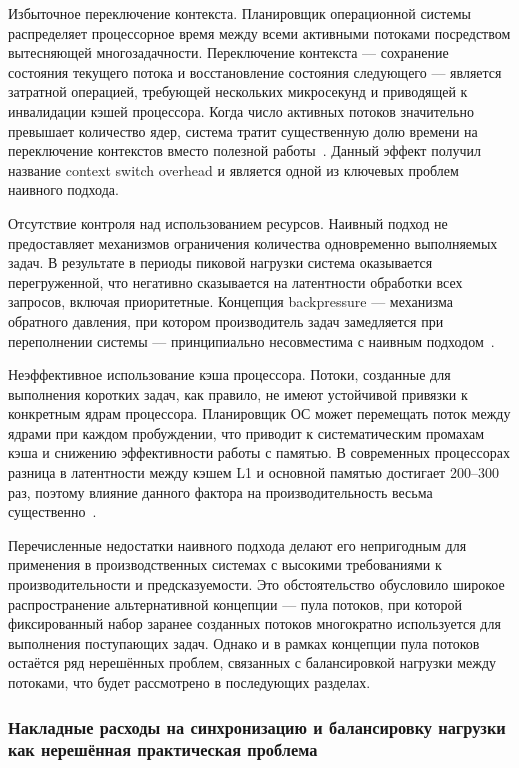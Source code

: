 Избыточное переключение контекста. Планировщик операционной системы распределяет процессорное время между всеми активными потоками посредством вытесняющей многозадачности. Переключение контекста --- сохранение состояния текущего потока и восстановление состояния следующего --- является затратной операцией, требующей нескольких микросекунд и приводящей к инвалидации кэшей процессора. Когда число активных потоков значительно превышает количество ядер, система тратит существенную долю времени на переключение контекстов вместо полезной работы~\cite{Tanenbaum2014}. Данный эффект получил название context switch overhead и является одной из ключевых проблем наивного подхода.

Отсутствие контроля над использованием ресурсов. Наивный подход не предоставляет механизмов ограничения количества одновременно выполняемых задач. В результате в периоды пиковой нагрузки система оказывается перегруженной, что негативно сказывается на латентности обработки всех запросов, включая приоритетные. Концепция backpressure --- механизма обратного давления, при котором производитель задач замедляется при переполнении системы --- принципиально несовместима с наивным подходом~\cite{Reactive2014}.

Неэффективное использование кэша процессора. Потоки, созданные для выполнения коротких задач, как правило, не имеют устойчивой привязки к конкретным ядрам процессора. Планировщик ОС может перемещать поток между ядрами при каждом пробуждении, что приводит к систематическим промахам кэша и снижению эффективности работы с памятью. В современных процессорах разница в латентности между кэшем L1 и основной памятью достигает 200--300 раз, поэтому влияние данного фактора на производительность весьма существенно~\cite{Drepper2007}.

Перечисленные недостатки наивного подхода делают его непригодным для применения в производственных системах с высокими требованиями к производительности и предсказуемости. Это обстоятельство обусловило широкое распространение альтернативной концепции --- пула потоков, при которой фиксированный набор заранее созданных потоков многократно используется для выполнения поступающих задач. Однако и в рамках концепции пула потоков остаётся ряд нерешённых проблем, связанных с балансировкой нагрузки между потоками, что будет рассмотрено в последующих разделах.

\subsubsection{Накладные расходы на синхронизацию и балансировку нагрузки как нерешённая практическая проблема}

